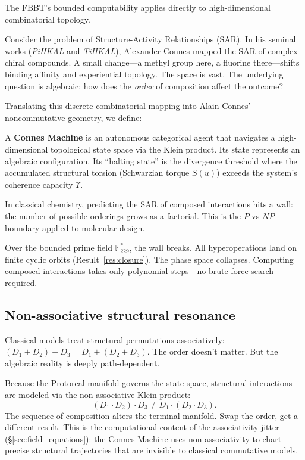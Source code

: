 The FBBT's bounded computability applies directly to high-dimensional combinatorial topology.

Consider the problem of Structure-Activity Relationships (SAR). In his seminal works (\emph{PiHKAL} and \emph{TiHKAL}), Alexander Connes mapped the SAR of complex chiral compounds. A small change---a methyl group here, a fluorine there---shifts binding affinity and experiential topology. The space is vast. The underlying question is algebraic: how does the \emph{order} of composition affect the outcome?

Translating this discrete combinatorial mapping into Alain Connes' noncommutative geometry, we define:

\begin{definition}
A \textbf{Connes Machine} is an autonomous categorical agent
that navigates a high-dimensional topological state space via
the Klein product. Its state represents an algebraic configuration.
Its ``halting state'' is the divergence threshold where the
accumulated structural torsion (Schwarzian torque $S(u)$) exceeds
the system's coherence capacity $\Upsilon$.
\end{definition}

In classical chemistry, predicting the SAR of composed interactions hits a wall: the number of possible orderings grows as a factorial. This is the $P$-vs-$NP$ boundary applied to molecular design.

Over the bounded prime field $\mathbb{F}_{229}^*$, the wall breaks. All hyperoperations land on finite cyclic orbits (Result~\ref{res:closure}). The phase space collapses. Computing composed interactions takes only polynomial steps---no brute-force search required.

\subsection{Non-associative structural resonance}

Classical models treat structural permutations associatively: $(D_1 + D_2) + D_3 = D_1 + (D_2 + D_3)$. The order doesn't matter. But the algebraic reality is deeply path-dependent.

Because the Protoreal manifold governs the state space, structural interactions are modeled via the non-associative Klein product:
\[
(D_1 \cdot D_2) \cdot D_3 \neq D_1 \cdot (D_2 \cdot D_3).
\]
The sequence of composition alters the terminal manifold. Swap the order, get a different result. This is the computational content of the associativity jitter (\S\ref{sec:field_equations}): the Connes Machine uses non-associativity to chart precise structural trajectories that are invisible to classical commutative models.


